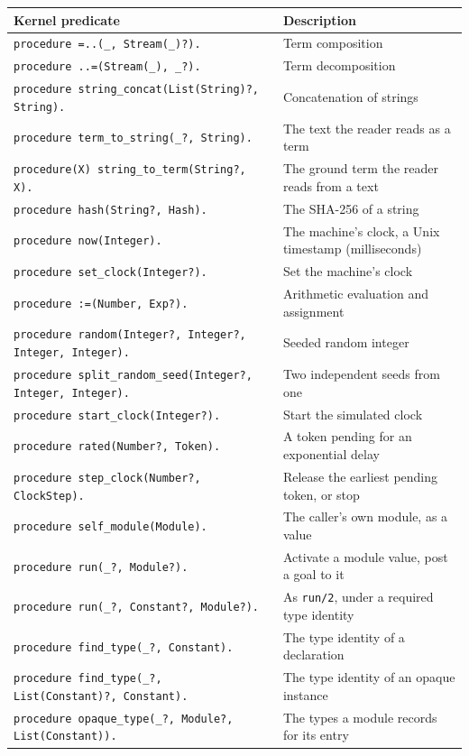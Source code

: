 \begin{center}
{\small
\begin{tabular}{ll}
\textbf{Kernel predicate} & \textbf{Description} \\
\hline
\verb|procedure =..(_, Stream(_)?).| & Term composition \\
\verb|procedure ..=(Stream(_), _?).| & Term decomposition \\
\verb|procedure string_concat(List(String)?, String).| & Concatenation of strings \\
\verb|procedure term_to_string(_?, String).| & The text the reader reads as a term \\
\verb|procedure(X) string_to_term(String?, X).| & The ground term the reader reads from a text \\
\verb|procedure hash(String?, Hash).| & The SHA-256 of a string \\
\verb|procedure now(Integer).| & The machine's clock, a Unix timestamp (milliseconds) \\
\verb|procedure set_clock(Integer?).| & Set the machine's clock \\
\verb|procedure :=(Number, Exp?).| & Arithmetic evaluation and assignment \\
\verb|procedure random(Integer?, Integer?, Integer, Integer).| & Seeded random integer \\
\verb|procedure split_random_seed(Integer?, Integer, Integer).| & Two independent seeds from one \\
\verb|procedure start_clock(Integer?).| & Start the simulated clock \\
\verb|procedure rated(Number?, Token).| & A token pending for an exponential delay \\
\verb|procedure step_clock(Number?, ClockStep).| & Release the earliest pending token, or stop \\
\verb|procedure self_module(Module).| & The caller's own module, as a value \\
\verb|procedure run(_?, Module?).| & Activate a module value, post a goal to it \\
\verb|procedure run(_?, Constant?, Module?).| & As \verb|run/2|, under a required type identity \\
\verb|procedure find_type(_?, Constant).| & The type identity of a declaration \\
\verb|procedure find_type(_?, List(Constant)?, Constant).| & The type identity of an opaque instance \\
\verb|procedure opaque_type(_?, Module?, List(Constant)).| & The types a module records for its entry \\

\end{tabular}}
\end{center}
